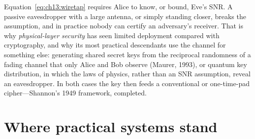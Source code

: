 \begin{pitfall}
Equation~\eqref{eq:ch13:wiretap} requires Alice to know, or bound, Eve's SNR. A passive eavesdropper
with a large antenna, or simply standing closer, breaks the assumption, and in practice nobody can
certify an adversary's receiver. That is why \emph{physical-layer security} has seen limited
deployment compared with cryptography, and why its most practical descendants use the channel for
something else: generating shared secret keys from the reciprocal randomness of a fading channel
that only Alice and Bob observe (Maurer, 1993), or quantum key distribution, in which the laws of
physics, rather than an SNR assumption, reveal an eavesdropper. In both cases the key then feeds a
conventional or one-time-pad cipher---Shannon's 1949 framework, completed.
\end{pitfall}

\section{Where practical systems stand}
\label{sec:ch13:today}


